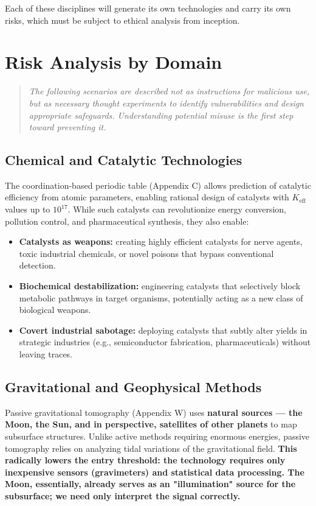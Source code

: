 \documentclass[12pt,a4paper]{article}
\theoremstyle{remark}
\newcommand{\Keff}{K_{\mathrm{eff}}}
\begin{document}
	Each of these disciplines will generate its own technologies and carry its own risks, which must be subject to ethical analysis from inception.
	
	\section{Risk Analysis by Domain}
	\label{sec:risks}
	
	\begin{quote}
		\emph{The following scenarios are described not as instructions for malicious use, but as necessary thought experiments to identify vulnerabilities and design appropriate safeguards. Understanding potential misuse is the first step toward preventing it.}
	\end{quote}
	
	\subsection{Chemical and Catalytic Technologies}
	\label{subsec:chem}
	
	The coordination-based periodic table (Appendix C) allows prediction of catalytic efficiency from atomic parameters, enabling rational design of catalysts with \(\Keff\) values up to \(10^{17}\). While such catalysts can revolutionize energy conversion, pollution control, and pharmaceutical synthesis, they also enable:
	\begin{itemize}[leftmargin=*]
		\item \textbf{Catalysts as weapons:} creating highly efficient catalysts for nerve agents, toxic industrial chemicals, or novel poisons that bypass conventional detection.
		\item \textbf{Biochemical destabilization:} engineering catalysts that selectively block metabolic pathways in target organisms, potentially acting as a new class of biological weapons.
		\item \textbf{Covert industrial sabotage:} deploying catalysts that subtly alter yields in strategic industries (e.g., semiconductor fabrication, pharmaceuticals) without leaving traces.
	\end{itemize}
	
	\subsection{Gravitational and Geophysical Methods}
	\label{subsec:gravity}
	
	Passive gravitational tomography (Appendix W) uses \textbf{natural sources — the Moon, the Sun, and in perspective, satellites of other planets} to map subsurface structures. Unlike active methods requiring enormous energies, passive tomography relies on analyzing tidal variations of the gravitational field. \textbf{This radically lowers the entry threshold: the technology requires only inexpensive sensors (gravimeters) and statistical data processing. The Moon, essentially, already serves as an "illumination" source for the subsurface; we need only interpret the signal correctly.}
	
\end{document}
